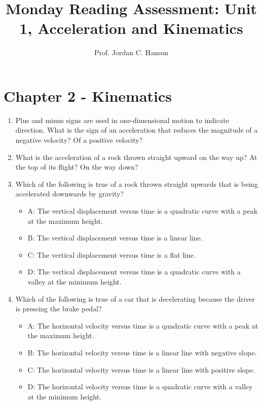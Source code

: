 \documentclass{article}
\begin{document}
\title{Monday Reading Assessment: Unit 1, Acceleration and Kinematics}
\author{Prof. Jordan C. Hanson}

\maketitle

\section{Chapter 2 - Kinematics}

\begin{enumerate}
\item Plus and minus signs are used in one-dimensional motion to indicate direction. What is the sign of an acceleration that
reduces the magnitude of a negative velocity? Of a positive velocity? \\ \vspace{3cm}
\item What is the acceleration of a rock thrown straight upward on the way up? At the top of its flight? On the way down? \\ \vspace{3cm}
\item Which of the following is true of a rock thrown straight upwards that is being accelerated downwards by gravity?
\begin{itemize}
\item A: The vertical displacement versus time is a quadratic curve with a peak at the maximum height.
\item B: The vertical displacement versus time is a linear line.
\item C: The vertical displacement versus time is a flat line.
\item D: The vertical displacement versus time is a quadratic curve with a valley at the minimum height.
\end{itemize}
\item Which of the following is true of a car that is decelerating because the driver is pressing the brake pedal?
\begin{itemize}
\item A: The horizontal velocity versus time is a quadratic curve with a peak at the maximum height.
\item B: The horizontal velocity versus time is a linear line with negative slope.
\item C: The horizontal velocity versus time is a linear line with positive slope.
\item D: The horizontal velocity versus time is a quadratic curve with a valley at the minimum height.
\end{itemize}
\end{enumerate}
\end{document}
